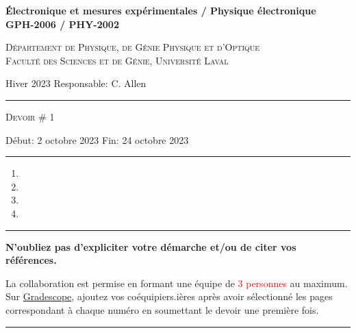 \documentclass[english,french,12pt]{article}
\newcommand{\onlyinsubfile}[1]{#1} %
\begin{document}
\renewcommand{\onlyinsubfile}[1]{}
%
%
\begin{center}
    \textbf{\large{Électronique et mesures expérimentales / Physique électronique}}\\
    \vspace{0.2em}
    \textbf{GPH-2006 / PHY-2002}\par
    \textsc{Département de Physique, de Génie Physique et d'Optique\\
    Faculté des Sciences et de Génie, Université Laval}
\end{center}
\noindent Hiver 2023 \hfill Responsable: C. Allen
\vspace{0.2em}
\hrule
\vspace{-1.5ex}
\begin{center}
    \textsc{Devoir \# 1}
\end{center}
\vspace{-4ex}
Début: 2 octobre 2023 \hfill Fin: 24 octobre 2023\par
\vspace{0.4em}
\hrule
\justify
%

\begin{enumerate}[label=\Roman*., itemsep=3ex, wide, labelwidth=!, labelindent=0pt]
    \setcounter{enumi}{0}
    \vspace{3ex}
    \item 
    \vspace{6ex}
    \item 
    \newpage
    \item 
    \vspace{3ex}
    \item 
\end{enumerate}
 
\vfill
\hrule
\vspace{0.3em}
\centering
\textbf{N'oubliez pas d'expliciter votre démarche et/ou de citer vos références.}\par
\vspace{-0.3em}
La collaboration est permise en formant une équipe de \textcolor{red}{3 personnes} au maximum. Sur \href{https://www.gradescope.com/}{Gradescope}, ajoutez vos coéquipiers.ières après avoir sélectionné les pages correspondant à chaque numéro en soumettant le devoir une première fois.\par
\vspace{1em}
\hrule
\end{document}
